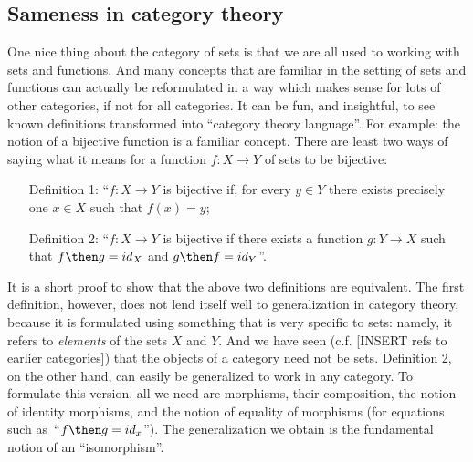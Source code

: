 
\subsection{Sameness in category theory}

One nice thing about the category of sets is that we are all used to working with sets and functions. And many concepts that are familiar in the setting of sets and functions can actually be reformulated in a way which makes sense for lots of other categories, if not for all categories. It can be fun, and insightful, to see known definitions transformed into ``category theory language''. For example: the notion of a bijective function is a familiar concept. There are least two ways of saying what it means for a function $f : X \to Y$ of sets to be bijective:
\begin{itemize}
\item[Definition 1:] ``$f\colon X \to Y$ is bijective if, for every $y \in Y$ there exists precisely one $x \in X$ such that $f(x) = y$;
\item[Definition 2:] ``$f: X \to Y$ is bijective if there exists a function $g\colon Y \rightarrow X$ such that $f \then g = id_X$ and $g \then f = id_Y$''. 
\end{itemize}

It is a short proof to show that the above two definitions are equivalent. The first definition, however, does not lend itself well to generalization in category theory, because it is formulated using something that is very specific to sets: namely, it refers to \emph{elements} of the sets $X$ and $Y$. And we have seen (c.f. [INSERT refs to earlier categories]) that the objects of a category need not be sets. Definition 2, on the other hand, can easily be generalized to work in any category. To formulate this version, all we need are morphisms, their composition, the notion of identity morphisms, and the notion of equality of morphisms (for equations such as~``$f \then g = id_x$''). The generalization we obtain is the fundamental notion of an ``isomorphism''.



